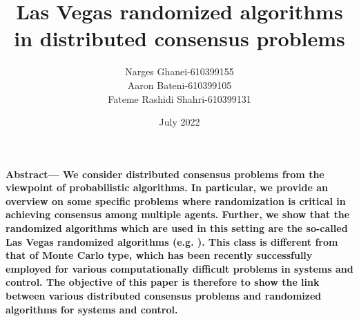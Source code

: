 \documentclass[12pt]{article}
\title{Las Vegas randomized algorithms in distributed consensus problems}
\author{Narges Ghanei-610399155 \\Aaron Bateni-610399105\\Fateme Rashidi Shahri-610399131 }
\date{July 2022}
\begin{document}
	
	\maketitle
	\textbf{Abstract— We consider distributed consensus problems from the viewpoint of probabilistic algorithms. In particular, we provide an overview on some specific problems where randomization is critical in achieving consensus among multiple agents. Further, we show that the randomized algorithms which are used in this setting are the so-called Las Vegas randomized algorithms (e.g. \cite{bib24}). This class is different from that of Monte Carlo type, which has been recently successfully employed for various computationally difficult problems in systems and control. The objective of this paper is therefore to show the link between various distributed consensus problems and randomized algorithms for systems and control.}
	
		
		\tableofcontents
		\newpage
		
\end{document}
